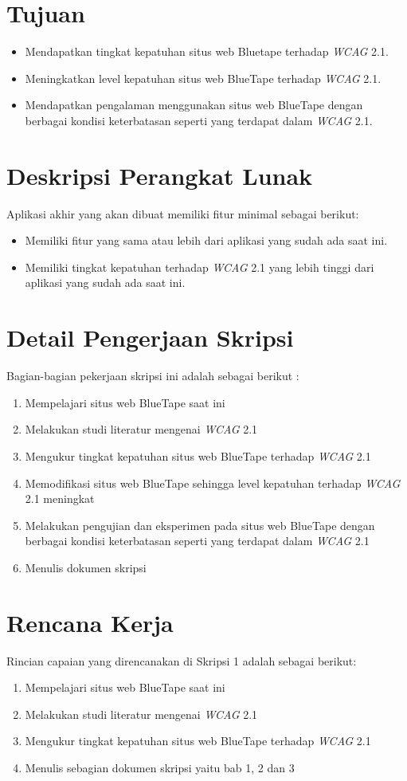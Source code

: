 \documentclass[a4paper,twoside]{article}
\begin{document}
\section{Tujuan}
\begin{itemize}
	\item Mendapatkan tingkat kepatuhan situs web Bluetape terhadap \textit{WCAG} 2.1.
	\item Meningkatkan level kepatuhan situs web BlueTape terhadap \textit{WCAG} 2.1.
	\item Mendapatkan pengalaman menggunakan situs web BlueTape dengan berbagai kondisi keterbatasan seperti yang terdapat dalam \textit{WCAG} 2.1.
\end{itemize}

\section{Deskripsi Perangkat Lunak}
Aplikasi akhir yang akan dibuat memiliki fitur minimal sebagai berikut:
\begin{itemize}
	\item Memiliki fitur yang sama atau lebih dari aplikasi yang sudah ada saat ini.
	\item Memiliki tingkat kepatuhan terhadap \textit{WCAG} 2.1 yang lebih tinggi dari aplikasi yang sudah ada saat ini.
\end{itemize}

\section{Detail Pengerjaan Skripsi}
Bagian-bagian pekerjaan skripsi ini adalah sebagai berikut :
\begin{enumerate}
	\item Mempelajari situs web BlueTape saat ini
	\item Melakukan studi literatur mengenai \textit{WCAG} 2.1
	\item Mengukur tingkat kepatuhan situs web BlueTape terhadap \textit{WCAG} 2.1
	\item Memodifikasi situs web BlueTape sehingga level kepatuhan terhadap \textit{WCAG} 2.1 meningkat
	\item Melakukan pengujian dan eksperimen pada situs web BlueTape dengan berbagai kondisi keterbatasan seperti yang terdapat dalam \textit{WCAG} 2.1
	\item Menulis dokumen skripsi
\end{enumerate}

\section{Rencana Kerja}
Rincian capaian yang direncanakan di Skripsi 1 adalah sebagai berikut:
\begin{enumerate}
\item Mempelajari situs web BlueTape saat ini
\item Melakukan studi literatur mengenai \textit{WCAG} 2.1
\item Mengukur tingkat kepatuhan situs web BlueTape terhadap \textit{WCAG} 2.1
\item Menulis sebagian dokumen skripsi yaitu bab 1, 2 dan 3
\end{enumerate}
\end{document}
